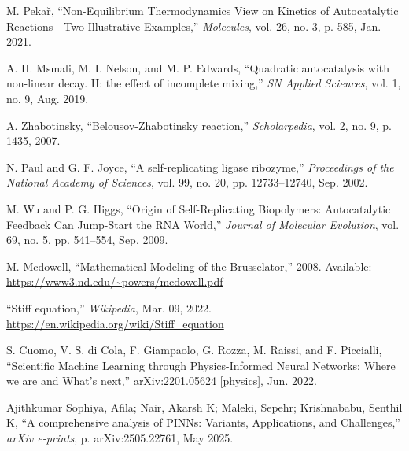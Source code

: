 \documentclass[11pt]{article}
\begin{document}
\newpage


\begin{thebibliography}{9}

M. Pekař, ``Non-Equilibrium Thermodynamics View on Kinetics of Autocatalytic Reactions—Two Illustrative Examples,'' \textit{Molecules}, vol. 26, no. 3, p. 585, Jan. 2021.

A. H. Msmali, M. I. Nelson, and M. P. Edwards, ``Quadratic autocatalysis with non-linear decay. II: the effect of incomplete mixing,'' \textit{SN Applied Sciences}, vol. 1, no. 9, Aug. 2019.

A. Zhabotinsky, ``Belousov-Zhabotinsky reaction,'' \textit{Scholarpedia}, vol. 2, no. 9, p. 1435, 2007.

N. Paul and G. F. Joyce, ``A self-replicating ligase ribozyme,'' \textit{Proceedings of the National Academy of Sciences}, vol. 99, no. 20, pp. 12733–12740, Sep. 2002.

M. Wu and P. G. Higgs, ``Origin of Self-Replicating Biopolymers: Autocatalytic Feedback Can Jump-Start the RNA World,'' \textit{Journal of Molecular Evolution}, vol. 69, no. 5, pp. 541–554, Sep. 2009.

M. Mcdowell, ``Mathematical Modeling of the Brusselator,'' 2008. Available: \url{https://www3.nd.edu/~powers/mcdowell.pdf}

``Stiff equation,'' \textit{Wikipedia}, Mar. 09, 2022. \url{https://en.wikipedia.org/wiki/Stiff_equation}

S. Cuomo, V. S. di Cola, F. Giampaolo, G. Rozza, M. Raissi, and F. Piccialli, ``Scientific Machine Learning through Physics-Informed Neural Networks: Where we are and What's next,'' arXiv:2201.05624 [physics], Jun. 2022.

Ajithkumar Sophiya, Afila; Nair, Akarsh K; Maleki, Sepehr; Krishnababu, Senthil K, ``A comprehensive analysis of PINNs: Variants, Applications, and Challenges,'' \textit{arXiv e-prints}, p. arXiv:2505.22761, May 2025.

\end{thebibliography}
\end{document}
